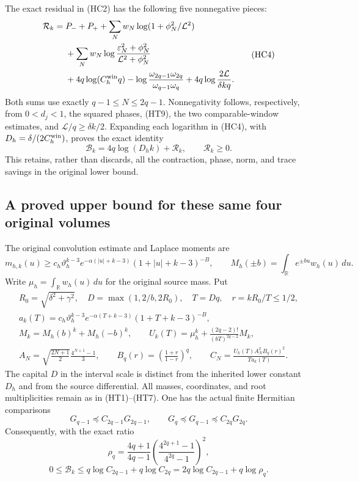 The exact residual in (HC2) has the following five nonnegative pieces:
\[
 \begin{split}
 \mathcal R_k={}&P_-+P_+
 +\sum_Nw_N\log(1+\phi_N^2/\mathcal L^2)\\
 &+\sum_Nw_N\log\frac{\varepsilon_N^2+\phi_N^2}
                              {\mathcal L^2+\phi_N^2}\\
 &+4q\log(C_h^{\rm win}q)
       -\log\frac{\omega_{2q-1}\omega_{2q}}{\omega_{q-1}\omega_q}
 +4q\log\frac{2\mathcal L}{\delta kq}.
 \end{split}\tag{HC4}
\]
Both sums use exactly $q-1\leq N\leq2q-1$.  Nonnegativity follows,
respectively, from $0<d_j<1$, the squared phases, (HT9), the two
comparable-window estimates, and $\mathcal L/q\geq\delta k/2$.
Expanding each logarithm in (HC4), with $D_h=\delta/(2C_h^{\rm win})$,
proves the exact identity
\[
 \boxed{\mathcal B_k=4q\log(D_hk)+\mathcal R_k,
 \qquad\mathcal R_k\geq0.}\tag{HC5}
\]
This retains, rather than discards, all the contraction, phase, norm,
and trace savings in the original lower bound.

\subsection{A proved upper bound for these same four original volumes}

The original convolution estimate and Laplace moments are
\[
 m_{h,k}(u)\geq c_h\vartheta_h^{k-3}
 e^{-\alpha(|u|+k-3)}(1+|u|+k-3)^{-B},\qquad
 M_h(\pm b)=\int_{\mathbb R}e^{\pm bu}w_h(u)\,du.
\]
Write $\mu_h=\int_{\mathbb R}w_h(u)\,du$ for the original source mass.
Put
\[
 \begin{gathered}
 R_0=\sqrt{\delta^2+\gamma^2},\quad
 D=\max(1,2/b,2R_0),\quad T=Dq,\quad r=kR_0/T\leq1/2,\\
 a_k(T)=c_h\vartheta_h^{k-3}e^{-\alpha(T+k-3)}
 (1+T+k-3)^{-B},\\
 M_k=M_h(b)^k+M_h(-b)^k,\qquad
 U_k(T)=\mu_h^k+\frac{(2q-2)!}{(bT)^{2q-2}}M_k,\\
 A_N=\sqrt{\frac{2N+1}{2}}\frac{4^{N+1}-1}{3},\qquad
 B_q(r)=\left(\frac{1+r}{1-r}\right)^q,\qquad
 C_N=\frac{U_k(T)A_N^2B_q(r)^2}{T a_k(T)}.
 \end{gathered}\tag{HC6}
\]
The capital $D$ in the interval scale is distinct from the inherited
lower constant $D_h$ and from the source differential.  All masses,
coordinates, and root multiplicities remain as in (HT1)--(HT7).
One has the actual finite Hermitian comparisons
\[
 G_{q-1}\preceq C_{2q-1}G_{2q-1},\qquad
 G_q\preceq G_{q-1}\preceq C_{2q}G_{2q}.
\]
Consequently, with the exact ratio
\[
 \rho_q=\frac{4q+1}{4q-1}
 \left(\frac{4^{2q+1}-1}{4^{2q}-1}\right)^2,
\]
\[
 \boxed{0\leq\mathcal B_k
 \leq q\log C_{2q-1}+q\log C_{2q}
 =2q\log C_{2q-1}+q\log\rho_q.}\tag{HC7}
\]

